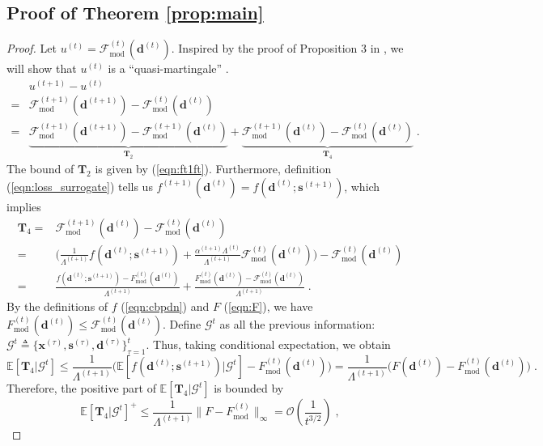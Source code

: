 \documentclass[final]{siamart1116}
\newcommand{\mb}[1]{\mathbf{#1}}
\def \co {\mathcal{O}}
\def \E  {\mathbb{E}}
\def \F  {\mathcal{F}}
\def \G  {\mathcal{G}}
\def \T {\mathbf{T}}
\begin{document}
\subsection{Proof of Theorem \ref{prop:main}}\label{app:mainprop}
\begin{proof}Let $u^{(t)} = \F^{(t)}_{\mathrm{mod}}(\mb{d}^{(t)})$. Inspired by the proof of Proposition 3 in \cite{mairal-2010-online}, we will show that $u^{(t)}$ is a ``quasi-martingale'' \cite{fisk1965quasi}.
\[
\begin{aligned}
&u^{(t+1)} - u^{(t)}\\
= &\F^{(t+1)}_{\mathrm{mod}}(\mb{d}^{(t+1)}) - \F^{(t)}_{\mathrm{mod}}(\mb{d}^{(t)})\\
 =& \underbrace{\F^{(t+1)}_{\mathrm{mod}}(\mb{d}^{(t+1)}) - \F^{(t+1)}_{\mathrm{mod}}(\mb{d}^{(t)})}_{\T_2} + \underbrace{\F^{(t+1)}_{\mathrm{mod}}(\mb{d}^{(t)}) -  \F^{(t)}_{\mathrm{mod}}(\mb{d}^{(t)})}_{\T_4} \;.
\end{aligned}
\]
The bound of $\T_2$ is given by (\ref{eqn:ft1ft}).  Furthermore, definition (\ref{eqn:loss_surrogate}) tells us $f^{(t+1)}(\mb{d}^{(t)}) = f(\mb{d}^{(t)};\mb{s}^{(t+1)})$, which implies
\[
\begin{aligned}
\T_4 =& \F^{(t+1)}_{\mathrm{mod}}(\mb{d}^{(t)}) -  \F^{(t)}_{\mathrm{mod}}(\mb{d}^{(t)})\\
=& \bigg(\frac{1}{\Lambda^{(t+1)}}f(\mb{d}^{(t)};\mb{s}^{(t+1)}) + \frac{\alpha^{(t+1)}\Lambda^{(t)}}{\Lambda^{(t+1)}} \F^{(t)}_{\mathrm{mod}}(\mb{d}^{(t)}) \bigg) -  \F^{(t)}_{\mathrm{mod}}(\mb{d}^{(t)})\\
=&\frac{f(\mb{d}^{(t)};\mb{s}^{(t+1)}) - F^{(t)}_{\mathrm{mod}}(\mb{d}^{(t)})}{\Lambda^{(t+1)}} + \frac{F^{(t)}_{\mathrm{mod}}(\mb{d}^{(t)}) - \F^{(t)}_{\mathrm{mod}}(\mb{d}^{(t)})}{\Lambda^{(t+1)}} \;.
\end{aligned}
\]
By the definitions of $f$ (\ref{eqn:cbpdn}) and $F$ (\ref{eqn:F}), we have $F^{(t)}_{\mathrm{mod}}(\mb{d}^{(t)}) \leq \F^{(t)}_{\mathrm{mod}}(\mb{d}^{(t)})$. Define $\G^t$ as all the previous information: $\G^t \triangleq \{ \mb{x}^{(\tau)}, \mb{s}^{(\tau)}, \mb{d}^{(\tau)} \}_{\tau=1}^t$. Thus, taking conditional expectation, we obtain
\[
\E[\T_4|\G^t] \leq \frac{1}{\Lambda^{(t+1)}}\Big(   \E[ f(\mb{d}^{(t)};\mb{s}^{(t+1)}) |\G^t]  - F^{(t)}_{\mathrm{mod}}(\mb{d}^{(t)})\Big)
= \frac{1}{\Lambda^{(t+1)}}\Big(   F(\mb{d}^{(t)})  - F^{(t)}_{\mathrm{mod}}(\mb{d}^{(t)})\Big) \;.
\]
Therefore, the positive part of $\E[\T_4|\G^t]$ is bounded by
\[
\E[\T_4|\G^t]^{+} \leq \frac{1}{\Lambda^{(t+1)}}\|   F  - F^{(t)}_{\mathrm{mod}}\|_{\infty} = \co\left(\frac{1}{t^{3/2}}\right)\;,
\]
\end{proof}
\end{document}
